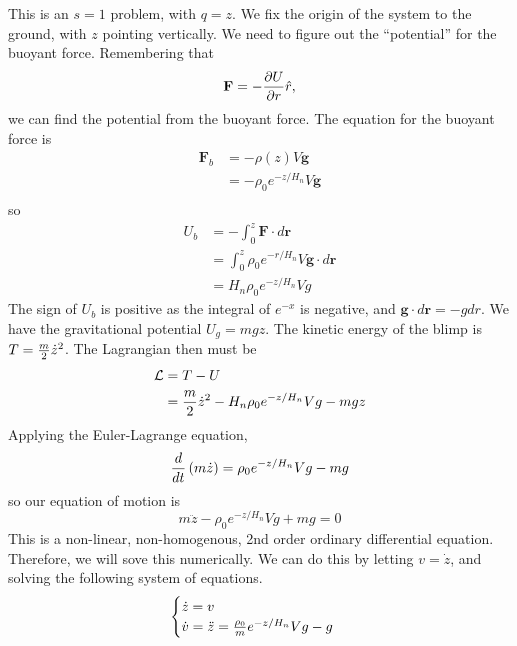 \documentclass[titlepage]{article}
\begin{document}
This is an $s = 1$ problem, with $q = z$. We fix the origin of the system to the ground, with $z$ pointing vertically. We need to figure out the ``potential'' for the buoyant force. Remembering that
\[
    \textbf{F} = - {\partial U \over \partial r} \hat{r},
\]
we can find the potential from the buoyant force. The equation for the buoyant force is
\[
    \begin{split}
        \textbf{F}_b &= - \rho(z) V \textbf{g} \\
        &= - \rho_{0} e^{-z / H_{n}} V \textbf{g} \\
    \end{split}
\]
so
\[
    \begin{split}
        U_b &= - \int_0^z \textbf{F} \cdot d\textbf{r} \\
        &= \int_0^z \rho_{0} e^{-r / H_{n}} V \textbf{g} \cdot d\textbf{r} \\
        &= H_n \rho_0 e^{-z/H_n} V g
    \end{split}
\]
The sign of $U_b$ is positive as the integral of $e^{-x}$ is negative, and $\textbf{g} \cdot d\textbf{r} = -g dr$. We have the gravitational potential $U_g = mgz$. The kinetic energy of the blimp is $T = {m \over 2} \dot{z}^2$. The Lagrangian then must be
\[
    \begin{split}
        \mathcal{L} &= T - U \\
        &= {m \over 2} \dot{z}^2 - H_n \rho_0 e^{-z/H_n} V g - mgz
    \end{split}
\]
Applying the Euler-Lagrange equation,
\[
    {d \over dt} \left( m\dot{z} \right) = \rho_0 e^{-z / H_n} V g - mg
\]
so our equation of motion is
\[
    m\ddot{z} - \rho_0 e^{-z / H_n} V g + mg = 0
\]
This is a non-linear, non-homogenous, 2nd order ordinary differential equation. Therefore, we will sove this numerically. We can do this by letting $v = \dot{z}$, and solving the following system of equations. 
\[
    \begin{cases}
        \dot{z} = v \\
        \dot{v} = \ddot{z} = {\rho_0 \over m} e^{-z / H_n} V g - g
    \end{cases}
\]

\newpage
\end{document}
